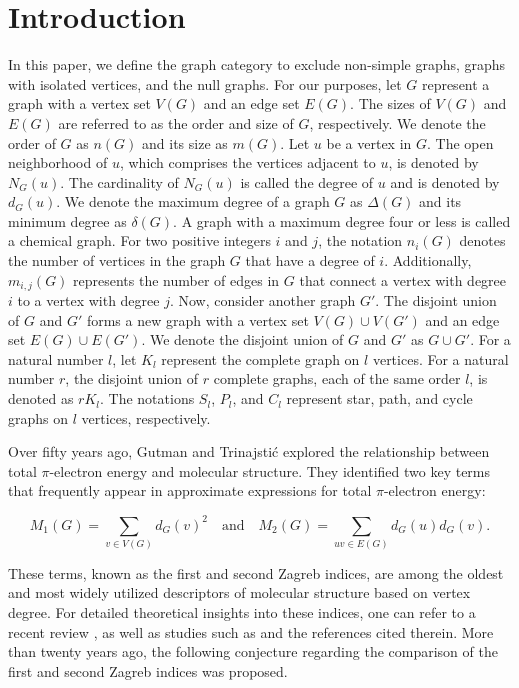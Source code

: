 \documentclass[12pt]{article}
\begin{document}
\section{Introduction}
In this paper, we define the graph category to exclude non-simple graphs, graphs with isolated vertices, and the null graphs. For our purposes, let $ G $ represent a graph with a vertex set $ V(G) $ and an edge set $ E(G) $. The sizes of $ V(G) $ and $ E(G) $ are referred to as the order and size of $ G $, respectively. We denote the order of $ G $ as $ n(G) $ and its size as $ m(G) $. Let $ u $ be a vertex in $ G $. The open neighborhood of $ u $, which comprises the vertices adjacent to $ u $, is denoted by $ N_G(u) $. The cardinality of $ N_G(u) $ is called the degree of $ u $ and is denoted by $ d_G(u) $. We denote the maximum degree of a graph $G$ as $\Delta(G)$ and its minimum degree as $\delta(G)$. A graph with a maximum degree four or less is called a chemical graph. For two positive integers \(i\) and \(j\), the notation \(n_i(G)\) denotes the number of vertices in the graph \(G\) that have a degree of \(i\). Additionally, \(m_{i,j}(G)\) represents the number of edges in \(G\) that connect a vertex with degree \(i\) to a vertex with degree \(j\). Now, consider another graph $ G' $. The disjoint union of $ G $ and $ G' $ forms a new graph with a vertex set $ V(G) \cup V(G') $ and an edge set $ E(G) \cup E(G') $. We denote the disjoint union of $ G $ and $ G' $ as $ G \cup G' $. For a natural number $ l $, let $ K_l $ represent the complete graph on $ l $ vertices. For a natural number $ r $, the disjoint union of $ r $ complete graphs, each of the same order $ l $, is denoted as $ rK_l $. The notations $ S_l$, $P_l$, and $C_l$ represent star, path, and cycle graphs on $l$ vertices, respectively. 

Over fifty years ago, Gutman and Trinajsti\'c explored the relationship between total  $\pi$-electron energy and molecular structure. They identified two key terms that frequently appear in approximate expressions for total  $\pi$-electron energy:

\[ M_1(G) = \sum_{v \in V(G)} d_G(v)^2 \quad \text{and} \quad M_2(G) = \sum_{uv \in E(G)} d_G(u)d_G(v). \]

These terms, known as the first and second Zagreb indices, are among the oldest and most widely utilized descriptors of molecular structure based on vertex degree. For detailed theoretical insights into these indices, one can refer to a recent review \cite{BD1}, as well as studies such as \cite{z1, JZD1, AD1, HD0, HD1, XD1} and the references cited therein. More than twenty years ago, the following conjecture regarding the comparison of the first and second Zagreb indices was proposed.
\end{document}
